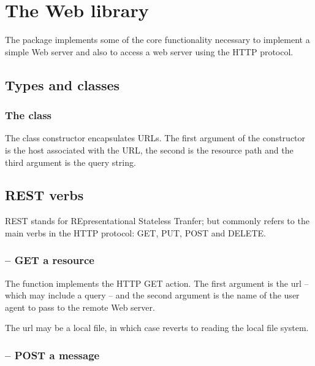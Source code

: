 \chapter{The Web library}
\label{http}
The  package implements some of the core functionality necessary to implement a simple Web server and also to access a web server using the HTTP protocol.


\section{Types and classes}

\subsection{The  class}
\label{http:url}

The  class constructor encapsulates URLs. The first argument of the constructor is the host associated with the URL, the second is the resource path and the third argument is the query string.

\section{REST verbs}
\label{http:rest}
REST stands for REpresentational Stateless Tranfer; but commonly refers to the main verbs in the HTTP protocol: GET, PUT, POST and DELETE.

\subsection{ -- GET a resource}
\label{http:get}
The  function implements the HTTP GET action. The first argument is the url -- which may include a query -- and the second argument is the name of the user agent to pass to the remote Web server.

The url may be a local file, in which case  reverts to reading the local file system.

\subsection{ -- POST a message}
\label{http:post}


 